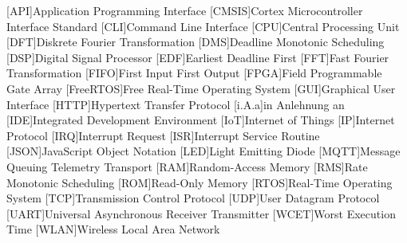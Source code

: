 \documentclass[../EDF Master Thesis.tex]{subfiles}
\begin{document}
    \begin{acronym}[abkuerzungen]
        [API]{Application Programming Interface}
        [CMSIS]{Cortex Microcontroller Interface Standard}
        [CLI]{Command Line Interface}
        [CPU]{Central Processing Unit}
        [DFT]{Diskrete Fourier Transformation}
        [DMS]{Deadline Monotonic Scheduling}
        [DSP]{Digital Signal Processor}
        [EDF]{Earliest Deadline First}
        [FFT]{Fast Fourier Transformation}
        [FIFO]{First Input First Output}
        [FPGA]{Field Programmable Gate Array}
        [FreeRTOS]{Free Real-Time Operating System}
        [GUI]{Graphical User Interface}
        [HTTP]{Hypertext Transfer Protocol}
        [i.A.a]{in Anlehnung an}
        [IDE]{Integrated Development Environment}
        [IoT]{Internet of Things}
        [IP]{Internet Protocol}
        [IRQ]{Interrupt Request}
        [ISR]{Interrupt Service Routine}
        [JSON]{JavaScript Object Notation}
        [LED]{Light Emitting Diode}
        [MQTT]{Message Queuing Telemetry Transport}
        [RAM]{Random-Access Memory}
        [RMS]{Rate Monotonic Scheduling}
        [ROM]{Read-Only Memory}
        [RTOS]{Real-Time Operating System}
        [TCP]{Transmission Control Protocol}
        [UDP]{User Datagram Protocol}
        [UART]{Universal Asynchronous Receiver Transmitter}
        [WCET]{Worst Execution Time}
        [WLAN]{Wireless Local Area Network}
	\end{acronym}
\end{document}
